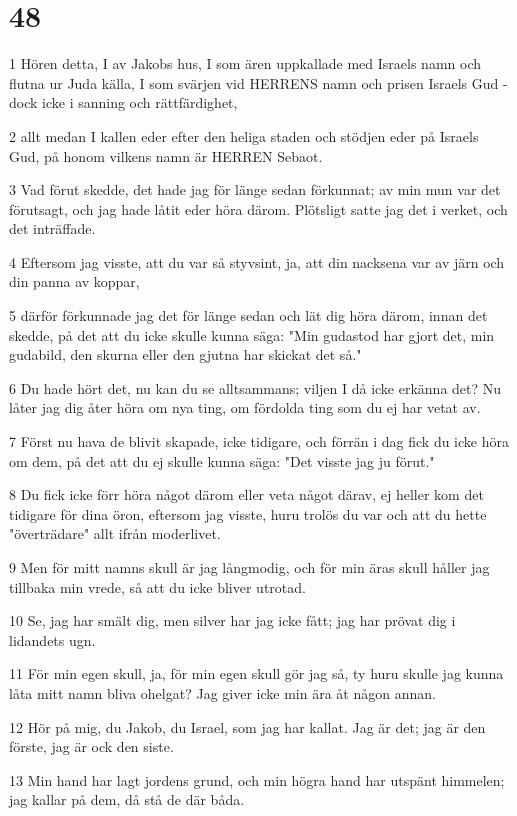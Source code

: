 \chapter{48}

\par 1 Hören detta, I av Jakobs hus, I som ären uppkallade med Israels namn och flutna ur Juda källa, I som svärjen vid HERRENS namn och prisen Israels Gud - dock icke i sanning och rättfärdighet,
\par 2 allt medan I kallen eder efter den heliga staden och stödjen eder på Israels Gud, på honom vilkens namn är HERREN Sebaot.
\par 3 Vad förut skedde, det hade jag för länge sedan förkunnat; av min mun var det förutsagt, och jag hade låtit eder höra därom. Plötsligt satte jag det i verket, och det inträffade.
\par 4 Eftersom jag visste, att du var så styvsint, ja, att din nacksena var av järn och din panna av koppar,
\par 5 därför förkunnade jag det för länge sedan och lät dig höra därom, innan det skedde, på det att du icke skulle kunna säga: "Min gudastod har gjort det, min gudabild, den skurna eller den gjutna har skickat det så."
\par 6 Du hade hört det, nu kan du se alltsammans; viljen I då icke erkänna det? Nu låter jag dig åter höra om nya ting, om fördolda ting som du ej har vetat av.
\par 7 Först nu hava de blivit skapade, icke tidigare, och förrän i dag fick du icke höra om dem, på det att du ej skulle kunna säga: "Det visste jag ju förut."
\par 8 Du fick icke förr höra något därom eller veta något därav, ej heller kom det tidigare för dina öron, eftersom jag visste, huru trolös du var och att du hette "överträdare" allt ifrån moderlivet.
\par 9 Men för mitt namns skull är jag långmodig, och för min äras skull håller jag tillbaka min vrede, så att du icke bliver utrotad.
\par 10 Se, jag har smält dig, men silver har jag icke fått; jag har prövat dig i lidandets ugn.
\par 11 För min egen skull, ja, för min egen skull gör jag så, ty huru skulle jag kunna låta mitt namn bliva ohelgat? Jag giver icke min ära åt någon annan.
\par 12 Hör på mig, du Jakob, du Israel, som jag har kallat. Jag är det; jag är den förste, jag är ock den siste.
\par 13 Min hand har lagt jordens grund, och min högra hand har utspänt himmelen; jag kallar på dem, då stå de där båda.
